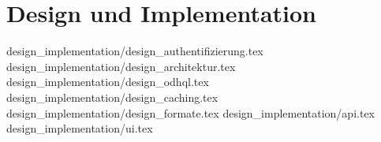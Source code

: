 \chapter{Design und Implementation}
{design_implementation/design_authentifizierung.tex}
{design_implementation/design_architektur.tex}
{design_implementation/design_odhql.tex}
{design_implementation/design_caching.tex}
{design_implementation/design_formate.tex}
{design_implementation/api.tex}
{design_implementation/ui.tex}







